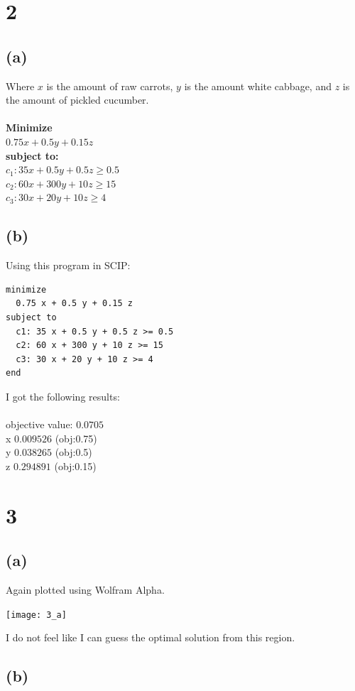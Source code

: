 \documentclass[12pt]{report}
\begin{document}
\newpage

\section*{2}
\subsection*{(a)}
Where $x$ is the amount of raw carrots, $y$ is the amount white cabbage, and $z$ is the amount of pickled cucumber. \\ \\
\textbf{Minimize}\\
  $0.75 x + 0.5 y + 0.15 z$\\
\textbf{subject to:}\\
  $c_1: 35 x + 0.5 y + 0.5 z \ge 0.5 $ \\
  $c_2: 60 x + 300 y + 10 z \ge 15 $ \\
  $c_3: 30 x + 20 y + 10 z \ge 4 $ \\

\subsection*{(b)}
Using this program in SCIP:
\begin{verbatim}
minimize
  0.75 x + 0.5 y + 0.15 z
subject to
  c1: 35 x + 0.5 y + 0.5 z >= 0.5
  c2: 60 x + 300 y + 10 z >= 15
  c3: 30 x + 20 y + 10 z >= 4
end
\end{verbatim}
I got the following results: \\ \\
objective value: $0.0705$\\
x $0.009526$   (obj:0.75) \\
y $0.038265$   (obj:0.5) \\
z $0.294891$   (obj:0.15)


\section*{3}
\subsection*{(a)}
Again plotted using Wolfram Alpha.

\texttt{[image: 3\_a]}

I do not feel like I can guess the optimal solution from this region.

\subsection*{(b)}
\end{document}
